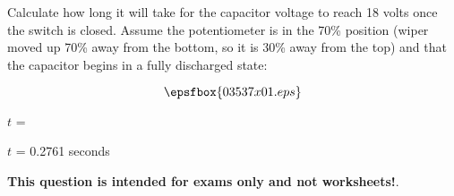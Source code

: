 

Calculate how long it will take for the capacitor voltage to reach 18 volts once the switch is closed.  Assume the potentiometer is in the 70\% position (wiper moved up 70\% away from the bottom, so it is 30\% away from the top) and that the capacitor begins in a fully discharged state:

$$\epsfbox{03537x01.eps}$$

$t$ = 







$t$ = 0.2761 seconds







{\bf This question is intended for exams only and not worksheets!}.



